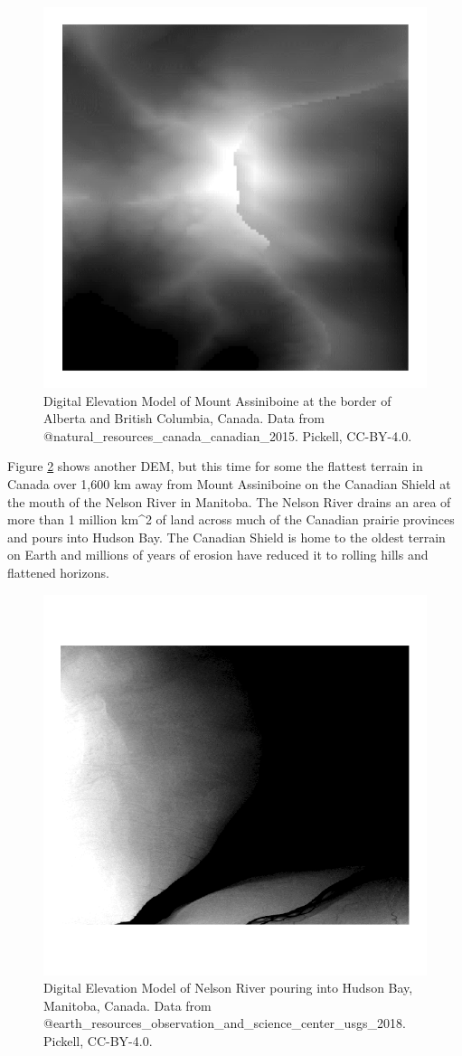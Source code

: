 \documentclass[
]{book}
\begin{document}
\begin{figure}
\includegraphics[width=0.75\linewidth]{images/09-mount-assiniboine-dem} \caption{Digital Elevation Model of Mount Assiniboine at the border of Alberta and British Columbia, Canada. Data from @natural_resources_canada_canadian_2015. Pickell, CC-BY-4.0.}\label{fig:9-mount-assiniboine-dem}
\end{figure}

Figure \ref{fig:9-nelson-river-dem} shows another DEM, but this time for some the flattest terrain in Canada over 1,600 km away from Mount Assiniboine on the Canadian Shield at the mouth of the Nelson River in Manitoba. The Nelson River drains an area of more than 1 million km\^{}2 of land across much of the Canadian prairie provinces and pours into Hudson Bay. The Canadian Shield is home to the oldest terrain on Earth and millions of years of erosion have reduced it to rolling hills and flattened horizons.

\begin{figure}
\includegraphics[width=0.75\linewidth]{images/09-nelson-river-dem} \caption{Digital Elevation Model of Nelson River pouring into Hudson Bay, Manitoba, Canada. Data from @earth_resources_observation_and_science_center_usgs_2018. Pickell, CC-BY-4.0.}\label{fig:9-nelson-river-dem}
\end{figure}
\end{document}
